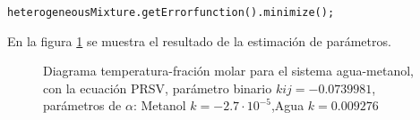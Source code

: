\begin{lstlisting}[label={lst:mixtureMinimize},caption={Estimación de los parámetros binarios de la regla de mezclado minimizando el valor de la función error.}]
	heterogeneousMixture.getErrorfunction().minimize();
\end{lstlisting}

	En la figura \ref{fig:binaryafter} se muestra el resultado de la estimación de parámetros.



\begin{figure}[!h]
	\centering
	\caption{Diagrama temperatura-fración molar para el sistema agua-metanol, con la ecuación PRSV, parámetro binario $kij=-0.0739981$, parámetros de $\alpha$: Metanol $k= -2.7 \cdot 10^{-5}$,Agua $ k= 0.009276$  }\label{fig:binaryafter}
\end{figure}









